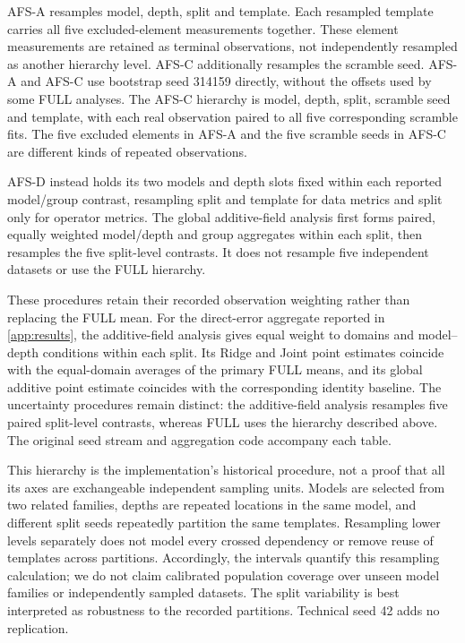 AFS-A resamples model, depth, split and template.
Each resampled template carries all five excluded-element
measurements together.
These element measurements are retained as terminal
observations, not independently resampled as another
hierarchy level.
AFS-C additionally resamples the scramble seed.
AFS-A and AFS-C use bootstrap seed 314159 directly,
without the offsets used by some FULL analyses.
The AFS-C hierarchy is model, depth, split, scramble seed
and template, with each real observation paired to all five
corresponding scramble fits.
The five excluded elements in AFS-A and the five scramble
seeds in AFS-C are different kinds of repeated observations.

AFS-D instead holds its two models and depth slots fixed
within each reported model/group contrast, resampling split
and template for data metrics and split only for operator
metrics.
The global additive-field analysis first forms paired,
equally weighted model/depth and group aggregates within
each split, then resamples the five split-level contrasts.
It does not resample five independent datasets or use
the FULL hierarchy.

These procedures retain their recorded observation weighting
rather than replacing the FULL mean.
For the direct-error aggregate reported in
\cref{app:results}, the additive-field analysis gives
equal weight to domains and model--depth conditions
within each split.
Its Ridge and Joint point estimates coincide with
the equal-domain averages of the primary FULL means,
and its global additive point estimate coincides
with the corresponding identity baseline.
The uncertainty procedures remain distinct:
the additive-field analysis resamples five paired
split-level contrasts, whereas FULL uses the
hierarchy described above.
The original seed stream and aggregation code accompany
each table.

This hierarchy is the implementation's historical procedure,
not a proof that all its axes are exchangeable independent
sampling units.
Models are selected from two related families, depths are
repeated locations in the same model, and different split
seeds repeatedly partition the same templates.
Resampling lower levels separately does not model every
crossed dependency or remove reuse of templates across
partitions.
Accordingly, the intervals quantify this resampling calculation;
we do not claim calibrated population coverage over unseen
model families or independently sampled datasets.
The split variability is best interpreted as robustness to
the recorded partitions.
Technical seed 42 adds no replication.

